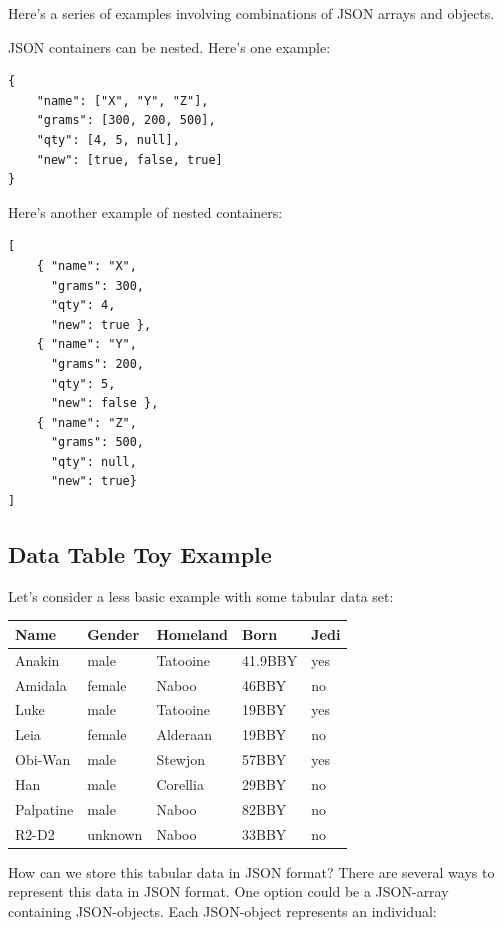 \documentclass[
]{book}
\begin{document}
Here's a series of examples involving combinations of JSON arrays and objects.

JSON containers can be nested. Here's one example:

\begin{verbatim}
{
    "name": ["X", "Y", "Z"],
    "grams": [300, 200, 500], 
    "qty": [4, 5, null],
    "new": [true, false, true]
}
\end{verbatim}

Here's another example of nested containers:

\begin{verbatim}
[
    { "name": "X", 
      "grams": 300,
      "qty": 4,
      "new": true },
    { "name": "Y",
      "grams": 200,
      "qty": 5,
      "new": false },
    { "name": "Z",
      "grams": 500, 
      "qty": null,
      "new": true}
]
\end{verbatim}

\hypertarget{data-table-toy-example}{%
\subsection{Data Table Toy Example}\label{data-table-toy-example}}

Let's consider a less basic example with some tabular data set:

\begin{longtable}[]{@{}lllll@{}}
\toprule\noalign{}
Name & Gender & Homeland & Born & Jedi \\
\midrule\noalign{}
\endhead
\bottomrule\noalign{}
\endlastfoot
Anakin & male & Tatooine & 41.9BBY & yes \\
Amidala & female & Naboo & 46BBY & no \\
Luke & male & Tatooine & 19BBY & yes \\
Leia & female & Alderaan & 19BBY & no \\
Obi-Wan & male & Stewjon & 57BBY & yes \\
Han & male & Corellia & 29BBY & no \\
Palpatine & male & Naboo & 82BBY & no \\
R2-D2 & unknown & Naboo & 33BBY & no \\
\end{longtable}

How can we store this tabular data in JSON format? There are several ways to
represent this data in JSON format. One option could be a JSON-array containing
JSON-objects. Each JSON-object represents an individual:
\end{document}
